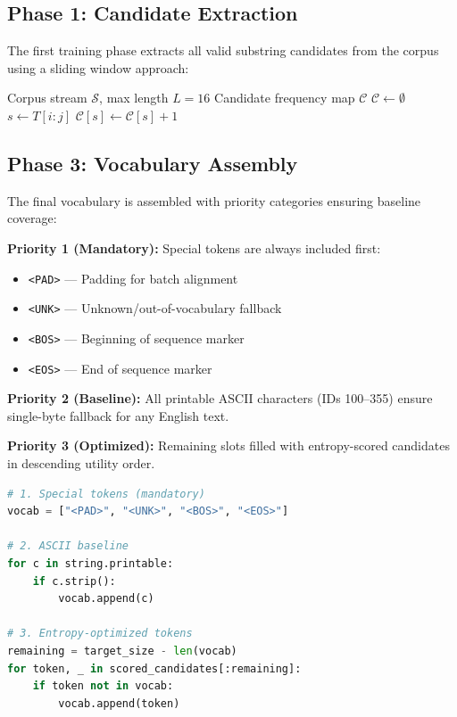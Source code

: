 \documentclass[11pt,a4paper,twocolumn]{article}
\begin{document}
\subsection{Phase 1: Candidate Extraction}

The first training phase extracts all valid substring candidates from the corpus using a sliding window approach:

\begin{algorithm}[H]
\caption{Candidate Extraction Algorithm}
\small
\begin{algorithmic}[1]
\Require Corpus stream $\mathcal{S}$, max length $L = 16$
\Ensure Candidate frequency map $\mathcal{C}$
\State $\mathcal{C} \gets \emptyset$
            \State $s \gets T[i:j]$
                \State $\mathcal{C}[s] \gets \mathcal{C}[s] + 1$
            \EndIf
        \EndFor
    \EndFor
\EndFor
\end{algorithmic}
\end{algorithm}

\subsection{Phase 3: Vocabulary Assembly}

The final vocabulary is assembled with priority categories ensuring baseline coverage:

\textbf{Priority 1 (Mandatory):} Special tokens are always included first:
\begin{itemize}
    \item \texttt{<PAD>} --- Padding for batch alignment
    \item \texttt{<UNK>} --- Unknown/out-of-vocabulary fallback
    \item \texttt{<BOS>} --- Beginning of sequence marker
    \item \texttt{<EOS>} --- End of sequence marker
\end{itemize}

\textbf{Priority 2 (Baseline):} All printable ASCII characters (IDs 100--355) ensure single-byte fallback for any English text.

\textbf{Priority 3 (Optimized):} Remaining slots filled with entropy-scored candidates in descending utility order.

\begin{lstlisting}[language=Python,caption=Vocabulary Assembly]
# 1. Special tokens (mandatory)
vocab = ["<PAD>", "<UNK>", "<BOS>", "<EOS>"]

# 2. ASCII baseline
for c in string.printable:
    if c.strip():
        vocab.append(c)

# 3. Entropy-optimized tokens
remaining = target_size - len(vocab)
for token, _ in scored_candidates[:remaining]:
    if token not in vocab:
        vocab.append(token)
\end{lstlisting}
\end{document}
